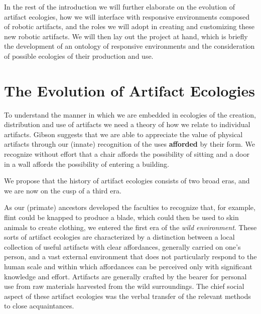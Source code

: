 In the rest of the introduction we will further elaborate on the evolution of artifact ecologies, how we will interface with responsive environments composed of robotic artifacts, and the roles we will adopt in creating and customizing these new robotic artifacts.
We will then lay out the project at hand, which is briefly the development of an ontology of responsive environments and the consideration of possible ecologies of their production and use.

\section{The Evolution of Artifact Ecologies}
%
To understand the manner in which we are embedded in ecologies of the creation, distribution and use of artifacts we need a theory of how we relate to individual artifacts.
Gibson \citeyearpar{gibson_1979} suggests that we are able to appreciate the value of physical artifacts through our (innate) recognition of the uses \textbf{afforded} by their form.
We recognize without effort that a chair affords the possibility of sitting and a door in a wall affords the possibility of entering a building. 

We propose that the history of artifact ecologies consists of two broad eras, and we are now on the cusp of a third era.

As our (primate) ancestors developed the faculties to recognize that, for example, flint could be knapped to produce a blade, which could then be used to skin animals to create clothing, we entered the first era of the \emph{wild environment}. 
These sorts of artifact ecologies are characterized by a distinction between a local collection of useful artifacts with clear affordances, generally carried on one's person, and a vast external environment that does not particularly respond to the human scale and within which affordances can be perceived only with significant knowledge and effort.
Artifacts are generally crafted by the bearer for personal use from raw materials harvested from the wild surroundings. 
The chief social aspect of these artifact ecologies was the verbal transfer of the relevant methods to close acquaintances.

